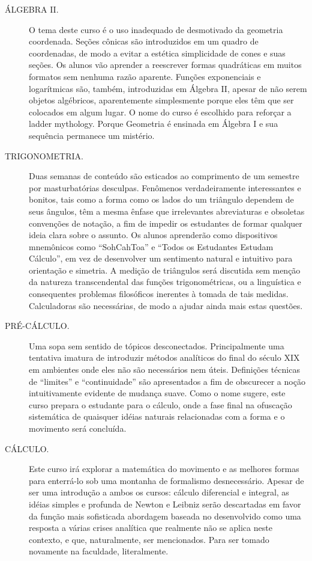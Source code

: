 \documentclass[a4paper,oneside,10pt,notitlepage]{article}
\begin{document}
\begin{description}
\item[ÁLGEBRA II.]
O tema deste curso é o uso inadequado de desmotivado da geometria coordenada.
Seções cônicas são introduzidos em um quadro de coordenadas, de modo a evitar a estética simplicidade de cones e suas seções.
Os alunos vão aprender a reescrever formas quadráticas em muitos formatos sem nenhuma razão aparente.
Funções exponenciais e logarítmicas são, também, introduzidas em Álgebra II, apesar de não serem objetos algébricos, aparentemente simplesmente porque eles têm que ser colocados em algum lugar.
O nome do curso é escolhido para reforçar a ladder mythology.
Porque Geometria é ensinada em Álgebra I e sua sequência permanece um mistério.

\item[TRIGONOMETRIA.]
Duas semanas de conteúdo são esticados ao comprimento de um semestre por masturbatórias desculpas.
Fenômenos verdadeiramente interessantes e bonitos, tais como a forma como os lados do um triângulo dependem de seus ângulos, têm a mesma ênfase que irrelevantes abreviaturas e obsoletas convenções de notação, a fim de impedir os estudantes de formar qualquer ideia clara sobre o assunto.
Os alunos aprenderão como dispositivos mnemônicos como ``SohCahToa'' e ``Todos os Estudantes Estudam Cálculo'', em vez de desenvolver um sentimento natural e intuitivo para orientação e simetria.
A medição de triângulos será discutida sem menção da natureza transcendental das funções trigonométricas, ou a linguística e consequentes problemas filosóficos inerentes à tomada de tais medidas.
Calculadoras são necessárias, de modo a ajudar ainda mais estas questões.

\item[PRÉ-CÁLCULO.]
Uma sopa sem sentido de tópicos desconectados.
Principalmente uma tentativa imatura de introduzir métodos analíticos do final do século XIX em ambientes onde eles não são necessários nem úteis.
Definições técnicas de ``limites'' e ``continuidade'' são apresentados a fim de obscurecer a noção intuitivamente evidente de mudança suave.
Como o nome sugere, este curso prepara o estudante para o cálculo, onde a fase final na ofuscação sistemática de quaisquer idéias naturais relacionadas com a forma e o movimento será concluída.

\item[CÁLCULO.]
Este curso irá explorar a matemática do movimento e as melhores formas para enterrá-lo sob uma montanha de formalismo desnecessário.
Apesar de ser uma introdução a ambos os cursos: cálculo diferencial e integral, as idéias simples e profunda de Newton e Leibniz serão descartadas em favor da função mais sofisticada abordagem baseada no desenvolvido como uma resposta a várias crises analítica que realmente não se aplica neste contexto, e que, naturalmente, ser mencionados.
Para ser tomado novamente na faculdade, literalmente. 
\end{description}
\end{document}
